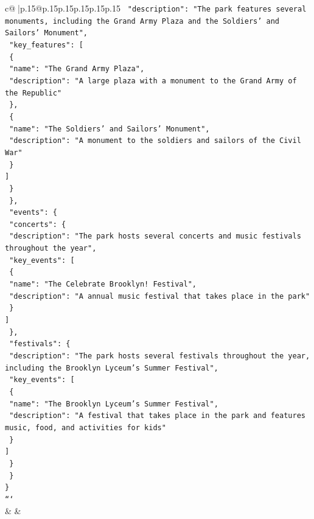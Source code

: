 \documentclass{article}
\begin{document}
{\begin{supertabular}{c@{$\;$}|p{.15\linewidth}@{}p{.15\linewidth}p{.15\linewidth}p{.15\linewidth}p{.15\linewidth}p{.15\linewidth}}
{{{\texttt{      "description": "The park features several monuments, including the Grand Army Plaza and the Soldiers' and Sailors' Monument",} \\
\texttt{      "key\_features": {[}} \\
\texttt{        \{} \\
\texttt{          "name": "The Grand Army Plaza",} \\
\texttt{          "description": "A large plaza with a monument to the Grand Army of the Republic"} \\
\texttt{        \},} \\
\texttt{        \{} \\
\texttt{          "name": "The Soldiers' and Sailors' Monument",} \\
\texttt{          "description": "A monument to the soldiers and sailors of the Civil War"} \\
\texttt{        \}} \\
\texttt{      {]}} \\
\texttt{    \}} \\
\texttt{  \},} \\
\texttt{  "events": \{} \\
\texttt{    "concerts": \{} \\
\texttt{      "description": "The park hosts several concerts and music festivals throughout the year",} \\
\texttt{      "key\_events": {[}} \\
\texttt{        \{} \\
\texttt{          "name": "The Celebrate Brooklyn! Festival",} \\
\texttt{          "description": "A annual music festival that takes place in the park"} \\
\texttt{        \}} \\
\texttt{      {]}} \\
\texttt{    \},} \\
\texttt{    "festivals": \{} \\
\texttt{      "description": "The park hosts several festivals throughout the year, including the Brooklyn Lyceum's Summer Festival",} \\
\texttt{      "key\_events": {[}} \\
\texttt{        \{} \\
\texttt{          "name": "The Brooklyn Lyceum's Summer Festival",} \\
\texttt{          "description": "A festival that takes place in the park and features music, food, and activities for kids"} \\
\texttt{        \}} \\
\texttt{      {]}} \\
\texttt{    \}} \\
\texttt{  \}} \\
\texttt{\}} \\
\texttt{```} \\
            }
        }
    }
    & & \\ \\


\end{supertabular}}
\end{document}
